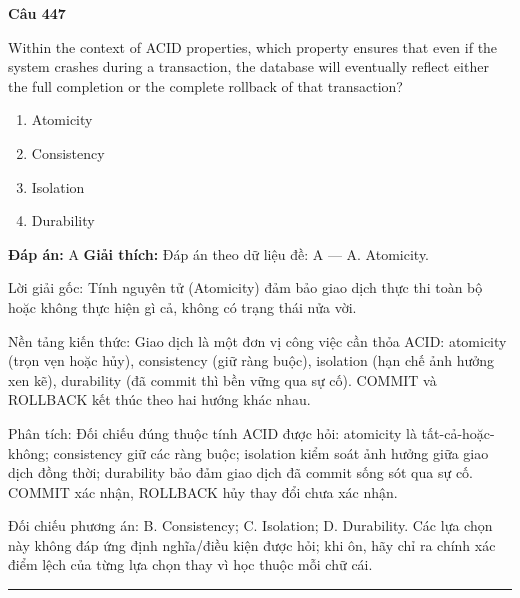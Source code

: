 \documentclass[11pt,a4paper]{article}
\newenvironment{question}[1]{%
  \par\vspace{1em}\noindent\textbf{\large Câu #1}\par\vspace{0.4em}
}{%
  \par\vspace{1em}\hrule\vspace{0.6em}
}
\newenvironment{choices}{%
  \begin{enumerate}[label=\textbf{\Alph*.},leftmargin=2.2em,itemsep=2pt,topsep=3pt]
}{%
  \end{enumerate}
}
\newcommand{\choice}{\item}
\begin{document}
\begin{question}{447}
Within the context of ACID properties, which property ensures that even if the system crashes during a transaction, the database will eventually reflect either the full completion or the complete rollback of that transaction?
\begin{choices}
\choice Atomicity
\choice Consistency
\choice Isolation
\choice Durability
\end{choices}
\textbf{Đáp án:} A
\textbf{Giải thích:} Đáp án theo dữ liệu đề: A — A. Atomicity.

Lời giải gốc: Tính nguyên tử (Atomicity) đảm bảo giao dịch thực thi toàn bộ hoặc không thực hiện gì cả, không có trạng thái nửa vời.

Nền tảng kiến thức: Giao dịch là một đơn vị công việc cần thỏa ACID: atomicity (trọn vẹn hoặc hủy), consistency (giữ ràng buộc), isolation (hạn chế ảnh hưởng xen kẽ), durability (đã commit thì bền vững qua sự cố). COMMIT và ROLLBACK kết thúc theo hai hướng khác nhau.

Phân tích: Đối chiếu đúng thuộc tính ACID được hỏi: atomicity là tất-cả-hoặc-không; consistency giữ các ràng buộc; isolation kiểm soát ảnh hưởng giữa giao dịch đồng thời; durability bảo đảm giao dịch đã commit sống sót qua sự cố. COMMIT xác nhận, ROLLBACK hủy thay đổi chưa xác nhận.

Đối chiếu phương án: B. Consistency; C. Isolation; D. Durability. Các lựa chọn này không đáp ứng định nghĩa/điều kiện được hỏi; khi ôn, hãy chỉ ra chính xác điểm lệch của từng lựa chọn thay vì học thuộc mỗi chữ cái.
\end{question}
\end{document}
